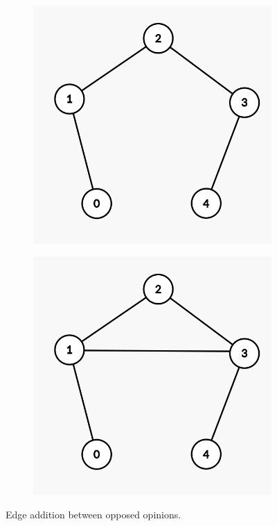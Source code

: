 \begin{figure}[h]
	\centering
	\begin{subfigure}[t]{0.3\textwidth}
		\centering
		\includegraphics[height=0.15\textheight]{Figures/p5A}
		\caption{}
		\label{subfig:monotonicityA}
	\end{subfigure}
	\hfill
	\begin{subfigure}[t]{0.3\textwidth}
		\centering
		\includegraphics[height=0.15\textheight]{Figures/p5B}
		\caption{}
		\label{subfig:monotonicityB}
	\end{subfigure}
	\vspace{20pt}
	\hfill
	\caption{Edge addition between opposed opinions.}
	\label{fig:p5}
\end{figure}

